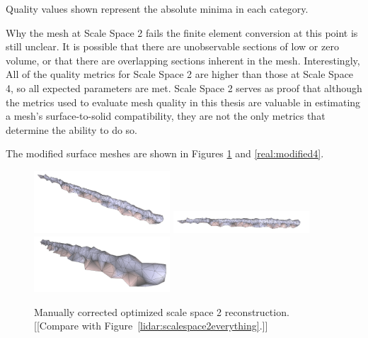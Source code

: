 \documentclass[12pt]{drexelthesis}
\begin{document}
\begin{table}[!ht]
	\centering
		\caption[Experimental scan exit characteristics after manual modification]{Exit quality analysis of experimental beam scan after manual modification.}
	Quality values shown represent the absolute minima in each category.
	\label{table:realmodified}
\end{table}

Why the mesh at Scale Space 2 fails the finite element conversion at this point is still unclear. It is possible that there are unobservable sections of low or zero volume, or that there are overlapping sections inherent in the mesh. Interestingly, All of the quality metrics for Scale Space 2 are higher than those at Scale Space 4, so all expected parameters are met. Scale Space 2 serves as proof that although the metrics used to evaluate mesh quality in this thesis are valuable in estimating a mesh's surface-to-solid compatibility, they are not the only metrics that determine the ability to do so.

The modified surface meshes are shown in Figures \ref{real:modified2} and \ref{real:modified4}.

\begin{figure}[!ht]
	\centering
		\includegraphics[width=2in]{real-lab-scans/meshed/optimized/scaleSpace2Modified00.png}
		\includegraphics[width=2in]{real-lab-scans/meshed/optimized/scaleSpace2Modified01.png}
		\includegraphics[width=2in]{real-lab-scans/meshed/optimized/scaleSpace2Modified02.png}
	\caption[Modified optimized surface mesh at scale space 2.]{\centering Manually corrected optimized scale space 2 reconstruction. [[Compare with Figure~\ref{lidar:scalespace2everything}.]]}
	\label{real:modified2}
\end{figure}
\end{document}
